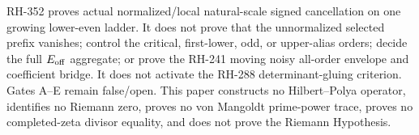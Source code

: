 \documentclass[11pt]{article}
\theoremstyle{remark}
\begin{document}
RH-352 proves actual normalized/local natural-scale signed cancellation on
one growing lower-even ladder.  It does not prove that the unnormalized
selected prefix vanishes; control the critical, first-lower, odd, or
upper-alias orders; decide the full $E_{\rm off}$ aggregate; or prove the
RH-241 moving noisy all-order envelope and coefficient bridge.  It does not
activate the RH-288 determinant-gluing criterion.  Gates A--E remain
false/open.  This paper constructs no Hilbert--Polya operator, identifies no
Riemann zero, proves no von Mangoldt prime-power trace, proves no
completed-zeta divisor equality, and does not prove the Riemann Hypothesis.



\end{document}
